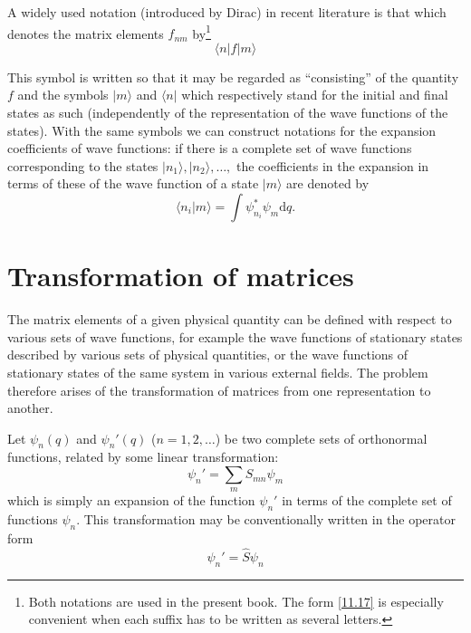 A widely used notation (introduced by Dirac) in recent literature is that which denotes the matrix elements $ f_{nm} $ by\footnote{Both notations are used in the present book. The form \eqref{11.17} is especially convenient when each suffix has to be written as several letters.
}
\begin{equation}\label{11.17}
\langle n|f|m\rangle
\end{equation}


This symbol is written so that it may be regarded as “consisting” of the quantity $ f $ and the symbols $ |m\rangle $ and $ \langle n| $ which respectively stand for the initial and final states as such (independently of the representation of the wave functions of the states). With the same symbols we can construct notations for the expansion coefficients of wave functions: if there is a complete set of wave functions corresponding to the states $ |n_1\rangle, |n_2\rangle,\dots, $ the coefficients in the expansion in terms of these of the wave function of a state $ |m\rangle $ are denoted by
\begin{equation}\label{11.18}
\langle n_i|m\rangle=\int\psi_{n_i}^*\psi_m\mathrm{d}q.
\end{equation}

\section{Transformation of matrices}\label{Transformation of matrices}
The matrix elements of a given physical quantity can be defined with respect to various sets of wave functions, for example the wave functions of stationary states described by various sets of physical quantities, or the wave functions of stationary states of the same system in various external fields. The problem therefore arises of the transformation of matrices from one representation to another.

Let $\psi_n(q)$ and $\psi_n'(q)$ ($ n = 1,2,\dots $) be two complete sets of orthonormal functions, related by some linear transformation:
\begin{equation}\label{12.1}
\psi_n'=\sum_{m}S_{mn}\psi_m
\end{equation}
which is simply an expansion of the function $\psi_n'$ in terms of the complete set of functions $\psi_n$. This transformation may be conventionally written in the operator form
\begin{equation}\label{12.2}
\psi_n'=\hat{S}\psi_n
\end{equation}


